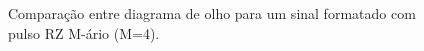 \begin{figure}[H]
\begin{center}
\end{center}
\caption{Comparação entre diagrama de olho para um sinal formatado com pulso RZ M-ário (M=4).}
\label{fig:7} 
\end{figure}


